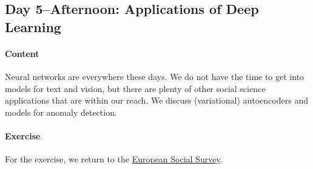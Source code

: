 \documentclass{article}
\begin{document}
\subsection{Day 5--Afternoon: Applications of Deep Learning}
\paragraph{Content}
Neural networks are everywhere these days. We do not have the time to get into models for text and vision, but there are plenty of other social science applications that are within our reach. We discuss (variational) autoencoders and models for anomaly detection.

\paragraph{Exercise}
For the exercise, we return to the \href{https://www.europeansocialsurvey.org/}{European Social Survey}.

\printbibliography
\end{document}
